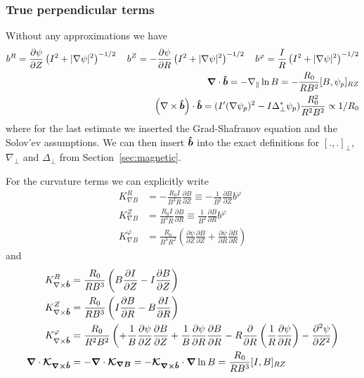 \subsubsection{True perpendicular terms}

Without any approximations we have
\begin{align}
b^R = {\frac{\partial \psi}{\partial Z}}\left(I^2+|\nabla\psi|^2\right)^{-1/2} \quad
b^Z = -{\frac{\partial \psi}{\partial R}}\left(I^2+|\nabla\psi|^2\right)^{-1/2} \quad 
b^\varphi = \frac{I}{R}\left(I^2+|\nabla\psi|^2\right)^{-1/2} \\
{\boldsymbol{\nabla}}\cdot\bm{\hat{b}} = -\nabla_\parallel \ln B = -\frac{R_0}{R B^2}[B,\psi_p]_{RZ} \\
\left({\nabla\times\bm{\hat{b}}}\right) \cdot\bm{\hat{b}} =
    (I'(\nabla\psi_p)^2 - I \Delta_\perp^* \psi_p)\frac{ R_0^2}{R^2B^2} \propto 1/R_0
\label{}
\end{align}
where for the last
estimate we inserted the Grad-Shafranov equation and the Solov'ev assumptions.
We can then insert $\bm{\hat{b}}$ into the exact definitions for $[.,.]_\perp$, $\nabla_\perp$ and $\Delta_\perp$ from Section~\ref{sec:magnetic}.

For the curvature terms we can explicitly write
\begin{align}
K_{\nabla B}^R &= -\frac{R_0 I}{B^3R}\frac{\partial B}{\partial Z} \equiv -\frac{1}{B^2}\frac{\partial B}{\partial Z}b^\varphi \\
K_{\nabla B}^Z &= \frac{R_0 I}{B^3R}\frac{\partial B}{\partial R}\equiv \frac{1}{B^2}\frac{\partial B}{\partial R}b^\varphi \\
K_{\nabla B}^\varphi &= \frac{R_0}{B^3R^2}\left(
      \frac{\partial \psi}{\partial Z} \frac{\partial B}{\partial Z}
    + \frac{\partial \psi}{\partial R}\frac{\partial B}{\partial R}\right)
\label{}
\end{align}
and
\begin{align}
K_{\nabla\times\bm{\hat{b}}}^R &= \frac{R_0 }{RB^3}\left( B\frac{\partial I}{\partial Z} -I\frac{\partial B}{\partial Z}\right) \\
K_{\nabla\times\bm{\hat{b}}}^Z &= \frac{R_0 }{RB^3} \left( I\frac{\partial B}{\partial R} - B\frac{\partial I}{\partial R} \right)\\
K_{\nabla\times\bm{\hat{b}}}^\varphi &= \frac{R_0}{R^2B^2}\left(
+ \frac{1}{B}\frac{\partial\psi}{\partial Z} \frac{\partial B}{\partial Z}
+ \frac{1}{B}\frac{\partial \psi}{\partial R}\frac{\partial B}{\partial R}
-R\frac{\partial}{\partial R}\left(\frac{1}{R}\frac{\partial\psi}{\partial R}\right) 
- \frac{\partial^2 \psi}{\partial Z^2}
\right) \\
{\boldsymbol{\nabla}}\cdot{\boldsymbol{\mathcal K_{\nabla\times\bm{\hat{b}}}}} &= -{\boldsymbol{\nabla}}\cdot{\boldsymbol{\mathcal K_{\nabla B}}}=
    -{\boldsymbol{\mathcal K_{\nabla\times\bm{\hat{b}}}}}\cdot {\boldsymbol{\nabla}}\ln B = \frac{R_0}{RB^3}[I,B]_{RZ}
\label{}
\end{align}

